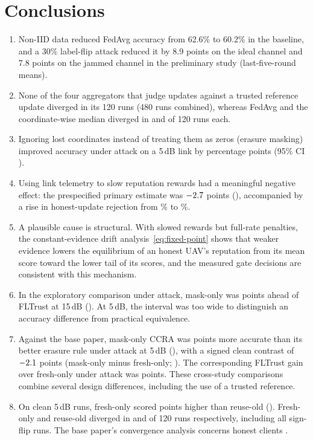 \section{Conclusions}
\begin{enumerate}
\item Non-IID data reduced FedAvg accuracy from 62.6\% to 60.2\% in the baseline,
  and a 30\% label-flip attack reduced it by 8.9 points on the ideal channel and
  7.8 points on the jammed channel in the preliminary study (last-five-round means).
\item None of the four aggregators that judge updates against a trusted reference
  update diverged in its 120 runs (480 runs combined), whereas FedAvg and the
  coordinate-wise median diverged in \DivFedavg{} and \DivMedian{} of 120 runs each.
\item Ignoring lost coordinates instead of treating them as zeros (erasure masking)
  improved accuracy under attack on a 5\,dB link by \MaskGain{} percentage points
  (95\% CI \ci{\MaskLo}{\MaskHi}).
\item Using link telemetry to slow reputation rewards had a meaningful negative
  effect: the prespecified primary estimate was $-2.7$ points
  (\ci{\PrimLo}{\PrimHi}), accompanied by a rise in honest-update rejection from
  \RejMask\% to \RejCcra\%.
\item A plausible cause is structural. With slowed rewards but full-rate penalties,
  the constant-evidence drift analysis~\eqref{eq:fixed-point} shows that weaker
  evidence lowers the equilibrium of an honest UAV's reputation from its mean score
  toward the lower tail of its scores, and the measured gate decisions are
  consistent with this mechanism.
\item In the exploratory comparison under attack, mask-only was \VsFltTrace{}
  points ahead of FLTrust at 15\,dB (\ci{\VsFltTraceLo}{\VsFltTraceHi}). At 5\,dB,
  the interval was too wide to distinguish an accuracy difference from practical
  equivalence.
\item Against the base paper, mask-only CCRA was \VsBpAttack{} points more accurate
  than its better erasure rule under attack at 5\,dB (\ci{\VsBpAttackLo}{\VsBpAttackHi}),
  with a signed clean contrast of $-2.1$ points (mask-only minus fresh-only;
  \ci{\VsBpCleanLo}{\VsBpCleanHi}). The corresponding FLTrust gain over
  fresh-only under attack was \FltVsBpAttack{} points. These cross-study
  comparisons combine several design differences, including the use of a
  trusted reference.
\item On clean 5\,dB runs, fresh-only scored \BpCleanGain{} points higher than
  reuse-old (\ci{\BpCleanLo}{\BpCleanHi}). Fresh-only and reuse-old diverged in
  \BpDivFresh{} and \BpDivReuse{} of 120 runs respectively, including all
  sign-flip runs. The base paper's convergence analysis concerns honest clients
  \cite{shirvanimoghaddam2022erroneous}.
\end{enumerate}

